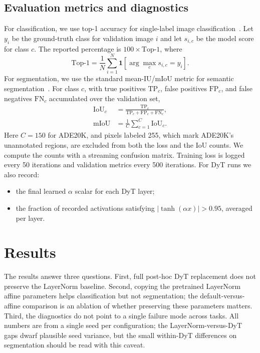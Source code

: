\documentclass[10pt,twocolumn,letterpaper]{article}
\newcommand{\miou}{\mathrm{mIoU}}
\begin{document}
\subsection{Evaluation metrics and diagnostics}
\label{subsec:metrics}

For classification, we use top-1 accuracy for single-label image classification~\cite{torralba2024foundations}. Let $y_i$ be the ground-truth class for validation image $i$ and let $s_{i,c}$ be the model score for class $c$. The reported percentage is $100 \times \mathrm{Top}\mbox{-}1$, where
\begin{equation}
    \mathrm{Top}\mbox{-}1 =
    \frac{1}{N}\sum_{i=1}^{N}
    \mathbf{1}\!\left[\arg\max_c s_{i,c} = y_i\right].
    \label{eq:top1}
\end{equation}
For segmentation, we use the standard mean-IU/mIoU metric for semantic segmentation~\cite{long2015fcn}. For class $c$, with true positives $\mathrm{TP}_c$, false positives $\mathrm{FP}_c$, and false negatives $\mathrm{FN}_c$ accumulated over the validation set,
\begin{equation}
\begin{aligned}
    \mathrm{IoU}_c &=
    \frac{\mathrm{TP}_c}{\mathrm{TP}_c + \mathrm{FP}_c + \mathrm{FN}_c},\\
    \miou &= \frac{1}{C}\sum_{c=1}^{C}\mathrm{IoU}_c .
\end{aligned}
    \label{eq:miou}
\end{equation}
Here $C=150$ for ADE20K, and pixels labeled 255, which mark ADE20K's unannotated regions, are excluded from both the loss and the IoU counts. We compute the counts with a streaming confusion matrix. Training loss is logged every 50 iterations and validation metrics every 500 iterations. For DyT runs we also record:
\begin{itemize}
    \item the final learned $\alpha$ scalar for each DyT layer;
    \item the fraction of recorded activations satisfying $|\tanh(\alpha x)| > 0.95$, averaged per layer.
\end{itemize}

\FloatBarrier
\section{Results}
\label{sec:results}

The results answer three questions. First, full post-hoc DyT replacement does not preserve the LayerNorm baseline. Second, copying the pretrained LayerNorm affine parameters helps classification but not segmentation; the default-versus-affine comparison is an ablation of whether preserving these parameters matters. Third, the diagnostics do not point to a single failure mode across tasks. All numbers are from a single seed per configuration; the LayerNorm-versus-DyT gaps dwarf plausible seed variance, but the small within-DyT differences on segmentation should be read with this caveat.
\end{document}
